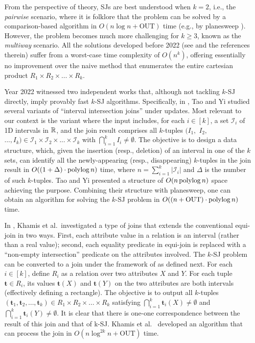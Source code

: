 \documentclass[acmsmall,review,anonymous]{acmart}
\def\vgap{\vspace{1mm}}
\def\I{\mathcal{I}}
\def\out{\mathrm{OUT}}
\begin{document}
\vgap

From the perspective of theory, SJs are best understood when $k = 2$, i.e., the {\em pairwise} scenario, where it is folklore that the problem can be solved by a comparison-based algorithm in $O(n \log n + \out)$ time (e.g., by planesweep \cite{bcko08}). However, the problem becomes much more challenging for $k \ge 3$, known as the {\em multiway} scenario. All the solutions developed  before 2022 (see \cite{gcn+13,mp98,mp01,pmt99} and the references therein) suffer from a worst-case time complexity of $O(n^k)$, offering essentially no improvement over the naive method that enumerates the entire cartesian product $R_1 \times R_2 \times ... \times R_k$.

\vgap

Year 2022 witnessed two independent works \cite{ty22,kcko22} that, although not tackling $k$-SJ directly, imply provably fast $k$-SJ algorithms. Specifically, in \cite{ty22}, Tao and Yi studied several variants of ``interval intersection joins'' under updates. Most relevant to our context is the variant where the input includes, for each $i \in [k]$, a set $\I_i$ of 1D intervals in $\mathbb{R}$, and the join result comprises all $k$-tuples $(I_1,$ $I_2,$ $..., I_k) \in \I_1 \times \I_2 \times ... \times \I_k$ with $\bigcap_{i=1}^k I_i \neq \emptyset$. The objective is to design a data structure, which, given the insertion (resp., deletion) of an interval in one of the $k$ sets, can identify all the newly-appearing (resp., disappearing) $k$-tuples in the join result in $O((1+\Delta) \cdot \operatorname*{polylog} n)$ time, where $n = \sum_{i=1}^k |\I_i|$ and $\Delta$ is the number of such $k$-tuples. Tao and Yi \cite{ty22} presented a structure of $O(n \operatorname*{polylog} n)$ space achieving the purpose. Combining their structure with planesweep, one can obtain an algorithm for solving the $k$-SJ problem in $O((n + \out) \cdot \polylog n)$ time.

\vgap

In \cite{kcko22}, Khamis et al.\ investigated a type of joins that extends the conventional equi-join in two ways. First, each attribute value in a relation is an interval (rather than a real value); second, each equality predicate in equi-join is replaced with a ``non-empty intersection'' predicate on the attributes involved. The $k$-SJ problem can be converted to a join under the framework of \cite{kcko22} as defined next. For each $i \in [k]$, define $R_i$ as a relation over two attributes $X$ and $Y$. For each tuple $\bm{t} \in R_i$, its values $\bm{t}(X)$ and $\bm{t}(Y)$ on the two attributes are both intervals (effectively defining a rectangle). The objective is to output all $k$-tuples $(\bm{t}_1, \bm{t}_2, ..., \bm{t}_k) \in R_1 \times R_2 \times ... \times R_k$ satisfying $\bigcap_{i=1}^k \bm{t}_i(X) \ne \emptyset$ and $\bigcap_{i=1}^k \bm{t}_i(Y) \ne \emptyset$. It is clear that there is one-one correspondence between the result of this join and that of k-SJ. Khamis et al.\ \cite{kcko22} developed an algorithm that can process the join  in $O(n \log^{2k} n + \out)$ time.
\end{document}
